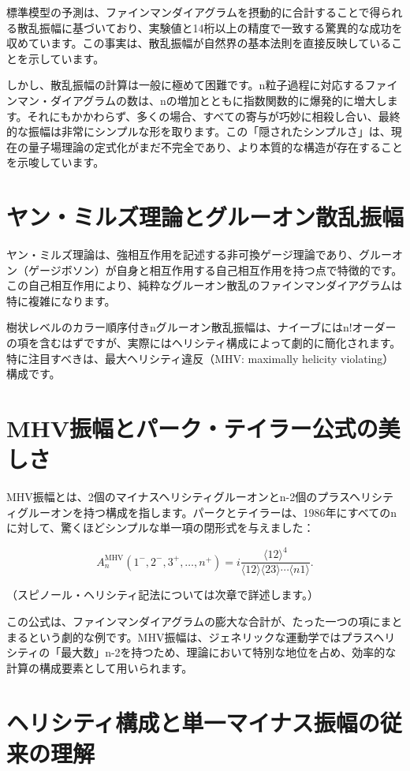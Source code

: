 \documentclass[dvipdfmx,a4paper]{jsbook}
\theoremstyle{definition}
\theoremstyle{remark}
\begin{document}
標準模型の予測は、ファインマンダイアグラムを摂動的に合計することで得られる散乱振幅に基づいており、実験値と14桁以上の精度で一致する驚異的な成功を収めています。この事実は、散乱振幅が自然界の基本法則を直接反映していることを示しています。

しかし、散乱振幅の計算は一般に極めて困難です。n粒子過程に対応するファインマン・ダイアグラムの数は、nの増加とともに指数関数的に爆発的に増大します。それにもかかわらず、多くの場合、すべての寄与が巧妙に相殺し合い、最終的な振幅は非常にシンプルな形を取ります。この「隠されたシンプルさ」は、現在の量子場理論の定式化がまだ不完全であり、より本質的な構造が存在することを示唆しています。

\section{ヤン・ミルズ理論とグルーオン散乱振幅}

ヤン・ミルズ理論は、強相互作用を記述する非可換ゲージ理論であり、グルーオン（ゲージボソン）が自身と相互作用する自己相互作用を持つ点で特徴的です。この自己相互作用により、純粋なグルーオン散乱のファインマンダイアグラムは特に複雑になります。

樹状レベルのカラー順序付きnグルーオン散乱振幅は、ナイーブにはn!オーダーの項を含むはずですが、実際にはヘリシティ構成によって劇的に簡化されます。特に注目すべきは、最大ヘリシティ違反（MHV: maximally helicity violating）構成です。

\section{MHV振幅とパーク・テイラー公式の美しさ}

MHV振幅とは、2個のマイナスヘリシティグルーオンとn-2個のプラスヘリシティグルーオンを持つ構成を指します。パークとテイラーは、1986年にすべてのnに対して、驚くほどシンプルな単一項の閉形式を与えました：

\[
A_n^{\text{MHV}}(1^-, 2^-, 3^+, \dots, n^+) = i \frac{\langle 12 \rangle^4}{\langle 12 \rangle \langle 23 \rangle \cdots \langle n1 \rangle}.
\]

（スピノール・ヘリシティ記法については次章で詳述します。）

この公式は、ファインマンダイアグラムの膨大な合計が、たった一つの項にまとまるという劇的な例です。MHV振幅は、ジェネリックな運動学ではプラスヘリシティの「最大数」n-2を持つため、理論において特別な地位を占め、効率的な計算の構成要素として用いられます。

\section{ヘリシティ構成と単一マイナス振幅の従来の理解}
\end{document}
